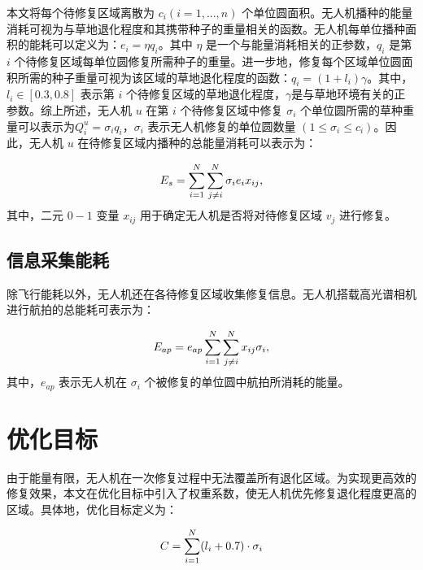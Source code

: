 \documentclass[AutoFakeBold]{LZUThesis}
\begin{document}
本文将每个待修复区域离散为 $c_i(i = 1, ..., n)$ 个单位圆面积。无人机播种的能量消耗可视为与草地退化程度和其携带种子的重量相关的函数。无人机每单位播种面积的能耗可以定义为：$e_i = \eta q_i$。其中 $\eta$ 是一个与能量消耗相关的正参数，$q_i$ 是第 $i$ 个待修复区域每单位圆修复所需种子的重量。进一步地，修复每个区域单位圆面积所需的种子重量可视为该区域的草地退化程度的函数\cite{klaus2017enriching}：$q_i = (1 + l_i) \gamma$。其中，$l_i \in [0.3, 0.8]$ 表示第 $i$ 个待修复区域的草地退化程度，$\gamma$是与草地环境有关的正参数。综上所述，无人机 $u$ 在第 $i$ 个待修复区域中修复 $\sigma_i$ 个单位圆所需的草种重量可以表示为$Q^u_i = \sigma_i q_i$，$\sigma_i$ 表示无人机修复的单位圆数量 $(1\leq\sigma_i\leq c_i)$。因此，无人机 $u$ 在待修复区域内播种的总能量消耗可以表示为：

\begin{equation} \label{seeding-energy}
	\begin{small}
		E_s = \sum^N_{i = 1}\sum^N_{j \neq i}\sigma_i e_i x_{ij},
	\end{small}
\end{equation}
其中，二元 $0-1$ 变量 $x_{ij}$ 用于确定无人机是否将对待修复区域 $v_j$ 进行修复。

\subsection{信息采集能耗}

除飞行能耗以外，无人机还在各待修复区域收集修复信息。无人机搭载高光谱相机进行航拍的总能耗可表示为：

\begin{equation} \label{hyper-spectral-camera-energy}
	\begin{scriptsize}
		E_{ap} = e_{ap}\sum^N_{i=1}\sum^N_{j \neq i} x_{ij}\sigma_i,
	\end{scriptsize}
\end{equation}
其中，$e_{ap}$ 表示无人机在 $\sigma_i$ 个被修复的单位圆中航拍所消耗的能量。

\section{优化目标}

由于能量有限，无人机在一次修复过程中无法覆盖所有退化区域。为实现更高效的修复效果，本文在优化目标中引入了权重系数，使无人机优先修复退化程度更高的区域。具体地，优化目标定义为：

\begin{equation} \label{maximize-weighted-sum}
	\begin{small}
		C = \sum_{i=1}^{N} (l_i + 0.7) \cdot \sigma_i
	\end{small}
\end{equation}
\end{document}
